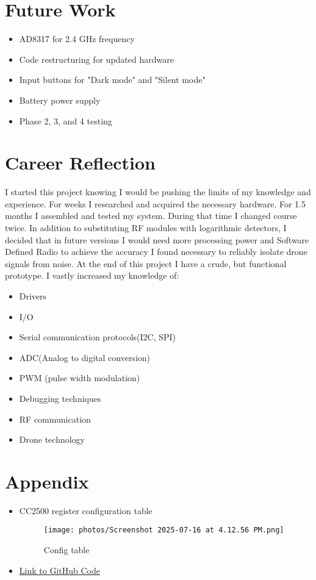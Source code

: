 \documentclass[12pt]{article}
\begin{document}
\section{Future Work}
\begin{itemize}
    \item AD8317 for 2.4 GHz frequency
    \item Code restructuring for updated hardware
    \item Input buttons for "Dark mode" and "Silent mode"
    \item Battery power supply
    \item Phase 2, 3, and 4 testing
\end{itemize}

\section{Career Reflection}
\text I started this project knowing I would be pushing the limits of my knowledge and experience. For weeks I researched and acquired the necessary hardware. For 1.5 months I assembled and tested my system. During that time I changed course twice. In addition to substituting RF modules with logarithmic detectors, I decided that in future versions I would need more processing power and Software Defined Radio to achieve the accuracy I found necessary to reliably isolate drone signals from noise. At the end of this project I have a crude, but functional prototype. I vastly increased my knowledge of: 
\begin{itemize}
    \item Drivers 
    \item I/O
    \item Serial communication protocols(I2C, SPI) 
    \item ADC(Analog to digital conversion)
    \item PWM (pulse width modulation)
    \item Debugging techniques
    \item RF communication
    \item Drone technology
\end{itemize}
\section{Appendix}
\begin{itemize}
    \item CC2500 register configuration table
    \begin{figure}[H]
    \centering
    \texttt{[image: photos/Screenshot 2025-07-16 at 4.12.56 PM.png]}
    \caption{Config table}
    \end{figure}
    \item \href{https://github.com/corbinpro/dradar_proj}{Link to GitHub Code}

    
\end{itemize}
\end{document}
